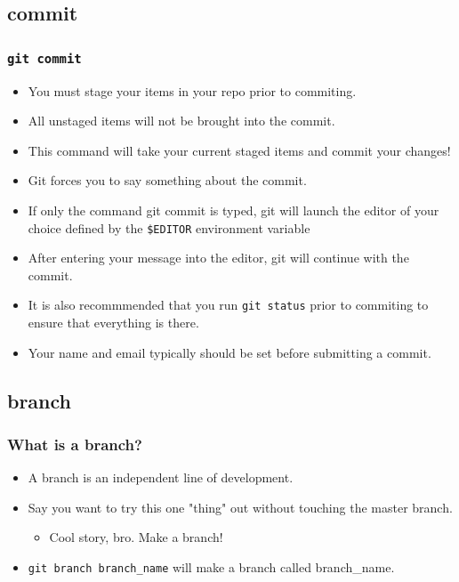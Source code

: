 \documentclass{beamer}
\begin{document}
\subsection{commit}
\begin{frame}
    \frametitle{\texttt{git commit}}
    \begin{itemize}
        \item{You must stage your items in your repo prior to commiting.}
        \item{All unstaged items will not be brought into the commit.}
        \item{This command will take your current staged items and commit your changes!}
        \item{Git forces you to say something about the commit.}
        \item{If only the command git commit is typed, git will launch the editor of your choice defined by the \texttt{\$EDITOR} environment variable}
        \item{After entering your message into the editor, git will continue with the commit.}
        \item{It is also recommmended that you run \texttt{git status} prior to commiting to ensure that everything is there.}
        \item{Your name and email typically should be set before submitting a commit.}
    \end{itemize}
\end{frame}

\subsection{branch}
\begin{frame}
    \frametitle{What is a branch?}
    \begin{itemize}
        \item{A branch is an independent line of development.}
        \item{Say you want to try this one "thing" out without touching the master branch.}
            \begin{itemize}
                \item{Cool story, bro. Make a branch!}
            \end{itemize}
        \item{\texttt{git branch branch\_name} will make a branch called branch\_name.}
    \end{itemize}
\end{frame}
\end{document}
